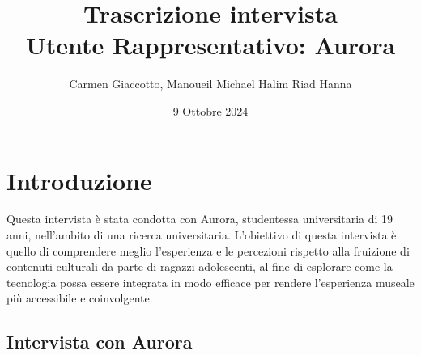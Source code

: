 \documentclass{article}
\title{\textbf{Trascrizione intervista}\\ Utente Rappresentativo: Aurora}
\author{Carmen Giaccotto, Manoueil Michael Halim Riad Hanna }
\date{9 Ottobre 2024}
\begin{document}
\maketitle

\section{Introduzione}
Questa intervista è stata condotta con Aurora, studentessa universitaria di 19 anni, nell'ambito di una ricerca universitaria. 
L’obiettivo di questa intervista è quello di comprendere meglio l'esperienza e le percezioni rispetto alla fruizione di contenuti culturali da parte di ragazzi adolescenti, al fine di esplorare come la tecnologia possa essere integrata in modo efficace per rendere l’esperienza museale più accessibile e coinvolgente.

\subsection{\textcolor{subsectioncolor}{Intervista con Aurora}}
\end{document}
